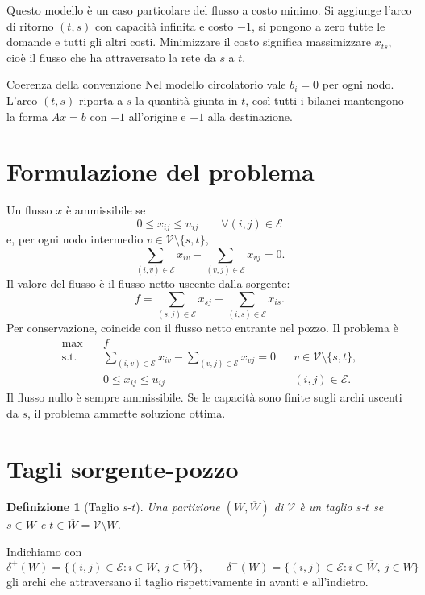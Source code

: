 \documentclass[11pt,a4paper]{article}
\newtheorem{definition}{Definizione}[section]
\newcommand{\V}{\mathcal{V}}
\newcommand{\E}{\mathcal{E}}
\newcommand{\Wbar}{\overline W}
\begin{document}
Questo modello è un caso particolare del flusso a costo minimo. Si aggiunge l'arco di ritorno $(t,s)$ con capacità infinita e costo $-1$, si pongono a zero tutte le domande e tutti gli altri costi. Minimizzare il costo significa massimizzare $x_{ts}$, cioè il flusso che ha attraversato la rete da $s$ a $t$.

\begin{examplebox}{Coerenza della convenzione}
Nel modello circolatorio vale $b_i=0$ per ogni nodo. L'arco $(t,s)$ riporta a $s$ la quantità giunta in $t$, così tutti i bilanci mantengono la forma $Ax=b$ con $-1$ all'origine e $+1$ alla destinazione.
\end{examplebox}

\section{Formulazione del problema}

Un flusso $x$ è ammissibile se
\[
0\leq x_{ij}\leq u_{ij}\qquad\forall(i,j)\in\E
\]
e, per ogni nodo intermedio $v\in\V\setminus\{s,t\}$,
\[
\sum_{(i,v)\in\E}x_{iv}-\sum_{(v,j)\in\E}x_{vj}=0.
\]
Il valore del flusso è il flusso netto uscente dalla sorgente:
\[
f=\sum_{(s,j)\in\E}x_{sj}-\sum_{(i,s)\in\E}x_{is}.
\]
Per conservazione, coincide con il flusso netto entrante nel pozzo. Il problema è
\begin{equation}\label{eq:maxflow}
\begin{aligned}
\max\quad & f\\
\text{s.t.}\quad &
\sum_{(i,v)\in\E}x_{iv}-\sum_{(v,j)\in\E}x_{vj}=0
&&v\in\V\setminus\{s,t\},\\
&0\leq x_{ij}\leq u_{ij}&&(i,j)\in\E.
\end{aligned}
\end{equation}
Il flusso nullo è sempre ammissibile. Se le capacità sono finite sugli archi uscenti da $s$, il problema ammette soluzione ottima.

\section{Tagli sorgente-pozzo}

\begin{definition}[Taglio $s$-$t$]
Una partizione $(W,\Wbar)$ di $\V$ è un taglio $s$-$t$ se $s\in W$ e $t\in\Wbar=\V\setminus W$.
\end{definition}

Indichiamo con
\[
\delta^+(W)=\{(i,j)\in\E:i\in W,\ j\in\Wbar\},\qquad
\delta^-(W)=\{(i,j)\in\E:i\in\Wbar,\ j\in W\}
\]
gli archi che attraversano il taglio rispettivamente in avanti e all'indietro.
\end{document}
